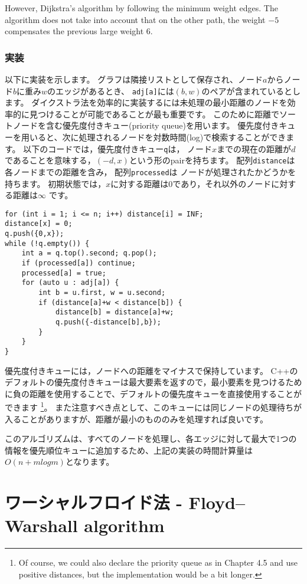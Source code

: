 However, Dijkstra's algorithm
by following the minimum weight edges.
The algorithm does not take into account that
on the other path, the weight $-5$
compensates the previous large weight $6$.

\subsubsection{実装}

以下に実装を示します。
グラフは隣接リストとして保存され、ノード$a$からノード$b$に重み$w$のエッジがあるとき、 \texttt{adj[a]}には$(b, w)$のペアが含まれているとします。
ダイクストラ法を効率的に実装するには未処理の最小距離のノードを効率的に見つけることが可能であることが最も重要です。
このために距離でソートノードを含む優先度付きキュー(priority queue)を用います。
優先度付きキューを用いると、次に処理されるノードを対数時間(log)で検索することができます。
以下のコードでは，優先度付きキュー\texttt{q}は，
ノード$x$までの現在の距離が$d$であることを意味する，$(-d, x)$という形のpairを持ちます。
配列\texttt{distance}は
各ノードまでの距離を含み，
配列\texttt{processed}は
ノードが処理されたかどうかを持ちます。
初期状態では，$x$に対する距離は0であり，それ以外のノードに対する距離は$\infty$ です。
\begin{lstlisting}
for (int i = 1; i <= n; i++) distance[i] = INF;
distance[x] = 0;
q.push({0,x});
while (!q.empty()) {
    int a = q.top().second; q.pop();
    if (processed[a]) continue;
    processed[a] = true;
    for (auto u : adj[a]) {
        int b = u.first, w = u.second;
        if (distance[a]+w < distance[b]) {
            distance[b] = distance[a]+w;
            q.push({-distance[b],b});
        }
    }
}
\end{lstlisting}


優先度付きキューには，ノードへの距離をマイナスで保持しています。
C++のデフォルトの優先度付きキューは最大要素を返すので，最小要素を見つけるために負の距離を使用することで、デフォルトの優先度キューを直接使用することができます
\footnote{Of
course, we could also declare the priority queue as in Chapter 4.5
and use positive distances, but the implementation would be a bit longer.}。
また注意すべき点として、このキューには同じノードの処理待ちが入ることがありますが、距離が最小のもののみを処理すれば良いです。

このアルゴリズムは、すべてのノードを処理し、各エッジに対して最大で1つの情報を優先順位キューに追加するため、上記の実装の時間計算量は$O(n + m log m)$となります。

\section{ワーシャルフロイド法 - Floyd–Warshall algorithm}

